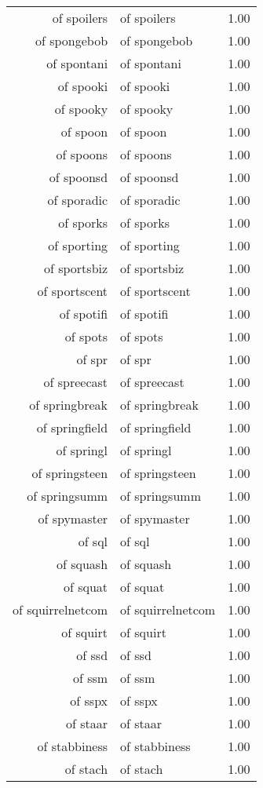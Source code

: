 \begin{table}[ht]
\begin{tabular}{rlr}
  of spoilers & of spoilers & 1.00 \\ 
  of spongebob & of spongebob & 1.00 \\ 
  of spontani & of spontani & 1.00 \\ 
  of spooki & of spooki & 1.00 \\ 
  of spooky & of spooky & 1.00 \\ 
  of spoon & of spoon & 1.00 \\ 
  of spoons & of spoons & 1.00 \\ 
  of spoonsd & of spoonsd & 1.00 \\ 
  of sporadic & of sporadic & 1.00 \\ 
  of sporks & of sporks & 1.00 \\ 
  of sporting & of sporting & 1.00 \\ 
  of sportsbiz & of sportsbiz & 1.00 \\ 
  of sportscent & of sportscent & 1.00 \\ 
  of spotifi & of spotifi & 1.00 \\ 
  of spots & of spots & 1.00 \\ 
  of spr & of spr & 1.00 \\ 
  of spreecast & of spreecast & 1.00 \\ 
  of springbreak & of springbreak & 1.00 \\ 
  of springfield & of springfield & 1.00 \\ 
  of springl & of springl & 1.00 \\ 
  of springsteen & of springsteen & 1.00 \\ 
  of springsumm & of springsumm & 1.00 \\ 
  of spymaster & of spymaster & 1.00 \\ 
  of sql & of sql & 1.00 \\ 
  of squash & of squash & 1.00 \\ 
  of squat & of squat & 1.00 \\ 
  of squirrelnetcom & of squirrelnetcom & 1.00 \\ 
  of squirt & of squirt & 1.00 \\ 
  of ssd & of ssd & 1.00 \\ 
  of ssm & of ssm & 1.00 \\ 
  of sspx & of sspx & 1.00 \\ 
  of staar & of staar & 1.00 \\ 
  of stabbiness & of stabbiness & 1.00 \\ 
  of stach & of stach & 1.00 \\ 

\end{tabular}
\end{table}
